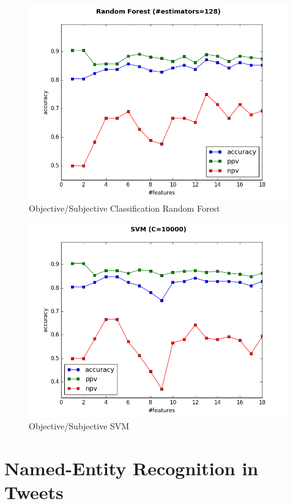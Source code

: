 \documentclass[letterpaper,twocolumn,10pt]{article}
\begin{document}
\begin{figure}[H]
	\centering
	\includegraphics[width=\columnwidth]{../graphs/SentimentAnalysis/random_forest.png}
	\caption{Objective/Subjective Classification Random Forest}
	\label{fig:obj_sub_classification_rf}
\end{figure}

\begin{figure}[H]
	\centering
	\includegraphics[width=\columnwidth]{../graphs/SentimentAnalysis/SVM.png}
	\caption{Objective/Subjective SVM}
	\label{fig:obj_sub_classification_svm}
\end{figure}

\section{Named-Entity Recognition in Tweets}
\end{document}
